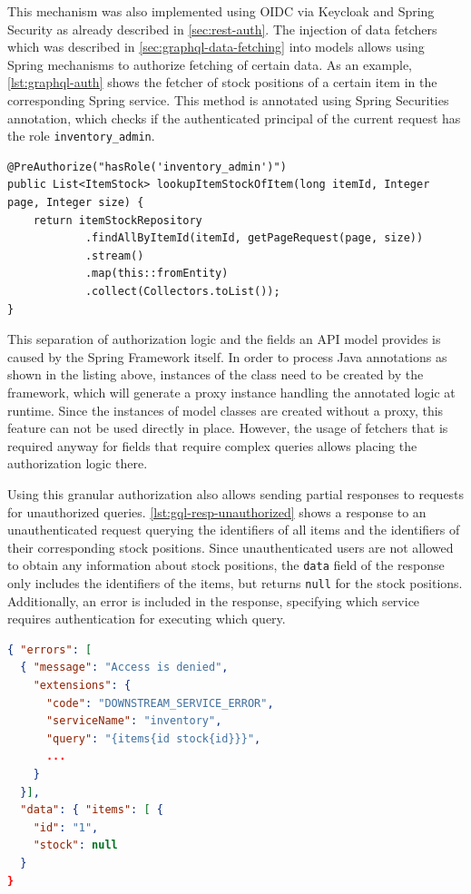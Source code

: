 This mechanism was also implemented using \ac{OIDC} via Keycloak and Spring Security as already described in \autoref{sec:rest-auth}.
The injection of data fetchers which was described in \autoref{sec:graphql-data-fetching} into models allows using Spring mechanisms to authorize fetching of certain data.
As an example, \autoref{lst:graphql-auth} shows the fetcher of stock positions of a certain item in the corresponding Spring service.
This method is annotated using Spring Securities annotation, which checks if the authenticated principal of the current request has the role \texttt{inventory\_admin}.

\begin{lstlisting}[caption={Authorization for Retrieval of Individual Fields}, style=java-ext, label={lst:graphql-auth}]
@PreAuthorize("hasRole('inventory_admin')")
public List<ItemStock> lookupItemStockOfItem(long itemId, Integer page, Integer size) {
    return itemStockRepository
            .findAllByItemId(itemId, getPageRequest(page, size))
            .stream()
            .map(this::fromEntity)
            .collect(Collectors.toList());
}
\end{lstlisting}

This separation of authorization logic and the fields an \ac{API} model provides is caused by the Spring Framework itself.
In order to process Java annotations as shown in the listing above, instances of the class need to be created by the framework, which will generate a proxy instance handling the annotated logic at runtime.
Since the instances of model classes are created without a proxy, this feature can not be used directly in place.
However, the usage of fetchers that is required anyway for fields that require complex queries allows placing the authorization logic there.

Using this granular authorization also allows sending partial responses to requests for unauthorized queries.
\autoref{lst:gql-resp-unauthorized} shows a response to an unauthenticated request querying the identifiers of all items and the identifiers of their corresponding stock positions.
Since unauthenticated users are not allowed to obtain any information about stock positions, the \texttt{data} field of the response only includes the identifiers of the items, but returns \texttt{null} for the stock positions.
Additionally, an error is included in the response, specifying which service requires authentication for executing which query.

\begin{lstlisting}[caption={Response to an Unauthorized Query}, language=json, label={lst:gql-resp-unauthorized}]
{ "errors": [
  { "message": "Access is denied",
    "extensions": { 
      "code": "DOWNSTREAM_SERVICE_ERROR",
      "serviceName": "inventory",
      "query": "{items{id stock{id}}}",
      ...
    }
  }],
  "data": { "items": [ {
    "id": "1",
    "stock": null
  }
}
\end{lstlisting}

